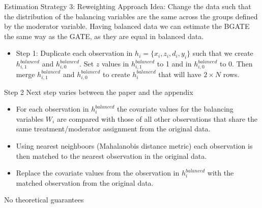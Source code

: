 \documentclass{beamer}\usepackage{listings}
\begin{document}
\begin{frame}[label={sec:orgce96805}]{Estimation Strategy 3: Reweighting Approach}
Idea: Change the data such that the distribution of the balancing variables are the same across the groups defined by the moderator variable. Having balanced data we can estimate the BGATE the same way as the GATE, as they are equal in balanced data.\pause

\begin{itemize}
\item Step 1: Duplicate each observation in \(h_i = \{x_i,z_i,d_i,y_i\}\) such that we create \(h^{balanced}_{i,1}\) and \(h^{balanced}_{i,0}\). Set \(z\) values in \(h^{balanced}_{i,1}\) to 1 and in \(h^{balanced}_{i,0}\) to 0. Then merge \(h^{balanced}_{i,1}\) and \(h^{balanced}_{i,0}\) to create \(h^{balanced}_i\) that will have \(2\times N\) rows.
\end{itemize}
\end{frame}


\begin{frame}[label={sec:orgbc16eae}]{Step 2}
Next step varies between the paper and the appendix
\begin{itemize}
\item For each observation in \(h^{balanced}_i\) the covariate values for the balancing variables \(W_i\) are compared with those of all other observations that share the same treatment/moderator assignment from the original data.\pause
\item Using nearest neighboors (Mahalanobis distance metric) each observation is then matched to the nearest observation in the original data.\pause
\item Replace the covariate values from the observation in \(h^{balanced}_i\) with the matched observation from the original data.\pause
\end{itemize}


No theoretical guarantees
\end{frame}
\end{document}
